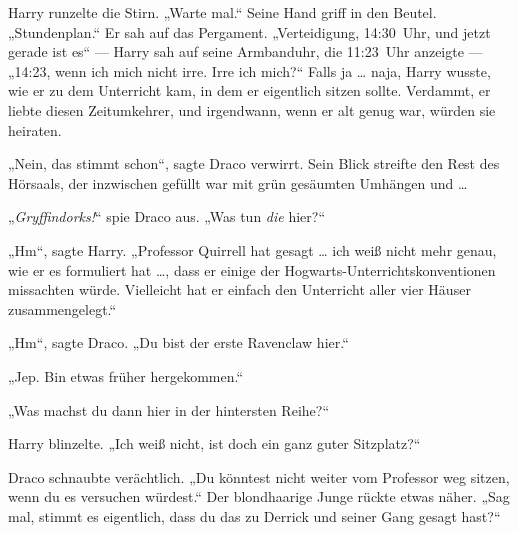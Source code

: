 Harry runzelte die Stirn.
„Warte mal.“ Seine Hand griff in den Beutel.
„Stundenplan.“ Er sah auf das Pergament.
„Verteidigung, 14:30~Uhr, und jetzt gerade ist es“ — Harry sah auf seine Armbanduhr, die 11:23~Uhr anzeigte — „14:23, wenn ich mich nicht irre. Irre ich mich?“ Falls ja … naja, Harry wusste, wie er zu dem Unterricht kam, in dem er eigentlich sitzen sollte. Verdammt, er liebte diesen Zeitumkehrer, und irgendwann, wenn er alt genug war, würden sie heiraten.

„Nein, das stimmt schon“, sagte Draco verwirrt. Sein Blick streifte den Rest des Hörsaals, der inzwischen gefüllt war mit grün gesäumten Umhängen und …

„\emph{Gryffindorks!}“ spie Draco aus.
„Was tun \emph{die} hier?“

„Hm“, sagte Harry.
„Professor Quirrell hat gesagt … ich weiß nicht mehr genau, wie er es formuliert hat …, dass er einige der Hogwarts-Unterrichtskonventionen missachten würde. Vielleicht hat er einfach den Unterricht aller vier Häuser zusammengelegt.“

„Hm“, sagte Draco.
„Du bist der erste Ravenclaw hier.“

„Jep. Bin etwas früher hergekommen.“

„Was machst du dann hier in der hintersten Reihe?“

Harry blinzelte.
„Ich weiß nicht, ist doch ein ganz guter Sitzplatz?“

Draco schnaubte verächtlich.
„Du könntest nicht weiter vom Professor weg sitzen, wenn du es versuchen würdest.“ Der blondhaarige Junge rückte etwas näher.
„Sag mal, stimmt es eigentlich, dass du das zu Derrick und seiner Gang gesagt hast?“

